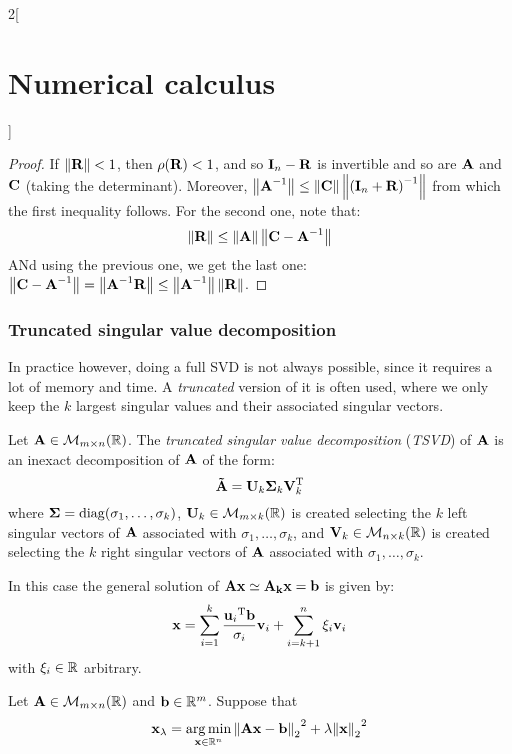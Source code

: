 \documentclass[../../../main_math.tex]{subfiles}
\begin{document}
\begin{multicols}{2}[\section{Numerical calculus}]
  \begin{proof}
    If $\left\|\boldsymbol{\mathrm{R}}\right\|<1$, then $\rho(\boldsymbol{\mathrm{R}})<1$, and so $\boldsymbol{\mathrm{I}}_n-\boldsymbol{\mathrm{R}}$ is invertible and so are $\boldsymbol{\mathrm{A}}$ and $\boldsymbol{\mathrm{C}}$ (taking the determinant). Moreover, $\left\|\boldsymbol{\mathrm{A}}^{-1}\right\|\leq \left\|\boldsymbol{\mathrm{C}}\right\|\left\|{(\boldsymbol{\mathrm{I}}_n+\boldsymbol{\mathrm{R}})}^{-1}\right\|$ from which the first inequality follows. For the second one, note that:
    \begin{equation*}
      \left\|\boldsymbol{\mathrm{R}}\right\|\leq \left\|\boldsymbol{\mathrm{A}}\right\|\left\|\boldsymbol{\mathrm{C}}-\boldsymbol{\mathrm{A}}^{-1}\right\|
    \end{equation*}
    ANd using the previous one, we get the last one: $\left\|\boldsymbol{\mathrm{C}}-\boldsymbol{\mathrm{A}}^{-1}\right\|=\left\|\boldsymbol{\mathrm{A}}^{-1}\boldsymbol{\mathrm{R}}\right\|\leq \left\|\boldsymbol{\mathrm{A}}^{-1}\right\|\left\|\boldsymbol{\mathrm{R}}\right\|$.
  \end{proof}
  \subsubsection{Truncated singular value decomposition}
  \begin{remark}
    In practice however, doing a full SVD is not always possible, since it requires a lot of memory and time. A \emph{truncated} version of it is often used, where we only keep the $k$ largest singular values and their associated singular vectors.
  \end{remark}
  \begin{definition}
    Let $\boldsymbol{\mathrm{A}}\in\mathcal{M}_{m\times n}(\mathbb{R})$. The \emph{truncated singular value decomposition} (\emph{TSVD}) of $\boldsymbol{\mathrm{A}}$ is an inexact decomposition of $\boldsymbol{\mathrm{A}}$ of the form:
    $$
      \boldsymbol{\mathrm{\tilde{A}}}=\boldsymbol{\mathrm{U}}_k\boldsymbol{\mathrm{\Sigma}}_k{\boldsymbol{\mathrm{V}}}^{\mathrm{T}}_k
    $$
    where $\boldsymbol{\mathrm{\Sigma}}=\operatorname{diag}(\sigma_1, \ldots, \sigma_k)$, $\boldsymbol{\mathrm{U}}_k\in \mathcal{M}_{m\times k}(\mathbb{R})$ is created selecting the $k$ left singular vectors of $\boldsymbol{\mathrm{A}}$ associated with $\sigma_1,\ldots, \sigma_k$, and $\boldsymbol{\mathrm{V}}_k\in \mathcal{M}_{n\times k}(\mathbb{R})$ is created selecting the $k$ right singular vectors of $\boldsymbol{\mathrm{A}}$ associated with $\sigma_1,\ldots, \sigma_k$.
  \end{definition}
  \begin{remark}
    In this case the general solution of $\boldsymbol{\mathrm{Ax}}\simeq\boldsymbol{\mathrm{A_kx}}=\boldsymbol{\mathrm{b}}$ is given by:
    $$
      \boldsymbol{\mathrm{x}} = \sum_{i=1}^k \frac{{\boldsymbol{\mathrm{u}}_i}^{\mathrm{T}}\boldsymbol{\mathrm{b}}}{\sigma_i}\boldsymbol{\mathrm{v}}_i + \sum_{i=k+1}^n\xi_i\boldsymbol{\mathrm{v}}_i
    $$
    with $\xi_i\in\mathbb{R}$ arbitrary.
  \end{remark}
  \begin{proposition}
    Let $\boldsymbol{\mathrm{A}}\in\mathcal{M}_{m\times n}(\mathbb{R})$ and $\boldsymbol{\mathrm{b}}\in \mathbb{R}^m$. Suppose that
    $$
      \boldsymbol{\mathrm{x}}_\lambda=\operatorname*{arg\,min}_{\boldsymbol{\mathrm{x}}\in\mathbb{R}^n}{\left\|\boldsymbol{\mathrm{Ax}}-\boldsymbol{\mathrm{b}}\right\|_2}^2+\lambda{\left\|\boldsymbol{\mathrm{x}}\right\|_2}^2
$$
\end{proposition}
\end{multicols}
\end{document}
